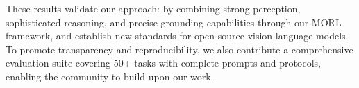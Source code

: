 These results validate our approach: by combining strong perception, sophisticated reasoning, and precise grounding capabilities through our MORL framework, \mimovlsft{} and \mimovlrl{} establish new standards for open-source vision-language models.
To promote transparency and reproducibility, we also contribute a comprehensive evaluation suite covering 50+ tasks with complete prompts and protocols, enabling the community to build upon our work.


